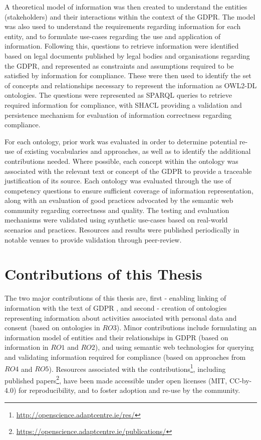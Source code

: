 A theoretical model of information was then created to understand the entities (stakeholders) and their interactions within the context of the GDPR. The model was also used to understand the requirements regarding information for each entity, and to formulate use-cases regarding the use and application of information. Following this, questions to retrieve information were identified based on legal documents published by legal bodies and organisations regarding the GDPR, and represented as constraints and assumptions required to be satisfied by information for compliance. These were then used to identify the set of concepts and relationships necessary to represent the information as OWL2-DL ontologies. The questions were represented as SPARQL queries to retrieve required information for compliance, with SHACL providing a validation and persistence mechanism for evaluation of information correctness regarding compliance.

For each ontology, prior work was evaluated in order to determine potential re-use of existing vocabularies and approaches, as well as to identify the additional contributions needed. Where possible, each concept within the ontology was associated with the relevant text or concept of the GDPR to provide a traceable justification of its source. Each ontology was evaluated through the use of competency questions to ensure sufficient coverage of information representation, along with an evaluation of good practices advocated by the semantic web community regarding correctness and quality. The testing and evaluation mechanisms were validated using synthetic use-cases based on real-world scenarios and practices. Resources and results were published periodically in notable venues to provide validation through peer-review.

\section{Contributions of this Thesis}\label{sec:intro-contributions}
The two major contributions of this thesis are, first - enabling linking of information with the text of GDPR , and second - creation of ontologies representing information about activities associated with personal data and consent (based on ontologies in $RO3$). Minor contributions include formulating an information model of entities and their relationships in GDPR (based on information in $RO1$ and $RO2$), and using semantic web technologies for querying and validating information required for compliance (based on approaches from $RO4$ and $RO5$). Resources associated with the contributions\footnote{\url{http://openscience.adaptcentre.ie/res/}}, including published papers\footnote{\url{https://openscience.adaptcentre.ie/publications/}}, have been made accessible under open licenses (MIT,  CC-by-4.0) for reproducibility, and to foster adoption and re-use by the community.

